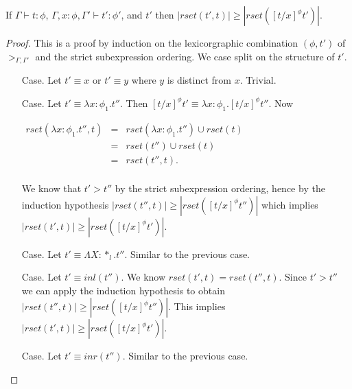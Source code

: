 \begin{lemma}
  \label{lemma:redex_preserving_ssfp}
  \small
  If $\Gamma \vdash t : \phi$, $\Gamma, x:\phi, \Gamma' \vdash t':\phi'$, and
  $t'$ then $|rset(t', t)| \geq |rset([t/x]^\phi t')|$.
\end{lemma}
\begin{proof}
  This is a proof by induction on the lexicorgraphic combination
$(\phi, t')$ of $>_{\Gamma,\Gamma'}$ and the strict subexpression ordering.
We case split on the structure of $t'$.  
\begin{itemize}
\item[Case.] Let $t' \equiv x$ or $t' \equiv y$ where $y$ is distinct from $x$.  Trivial. 
  
\item[Case.] Let $t' \equiv \lambda x:\phi_1.t''$.  Then $[t/x]^\phi t' \equiv \lambda x:\phi_1.[t/x]^\phi t''$.
  Now 
  \begin{center}
    \begin{math}
      \begin{array}{lll}
        rset(\lambda x:\phi_1.t'', t) & = & rset(\lambda x:\phi_1.t'') \cup rset(t)\\
        & = & rset(t'') \cup rset(t)\\
        & = & rset(t'', t).\\
      \end{array}
    \end{math}
  \end{center}
  We know that $t' > t''$ by the strict subexpression ordering, hence by the induction hypothesis
  $|rset(t'', t)| \geq |rset([t/x]^\phi t'')|$ which implies $|rset(t', t)| \geq |rset([t/x]^\phi t')|$.
  
\item[Case.] Let $t' \equiv \Lambda X:*_l.t''$.  Similar to the previous case.
  
\item[Case.] Let $t' \equiv inl(t'')$. We know $rset(t', t) = rset(t'', t)$.  Since $t' > t''$ we can apply
  the induction hypothesis to obtain $|rset(t'', t)| \geq |rset([t/x]^\phi t'')|$.  This implies
  $|rset(t', t)| \geq |rset([t/x]^\phi t')|$.
  
\item[Case.] Let $t' \equiv inr(t'')$. Similar to the previous case.  
  

\end{itemize}
\end{proof}
